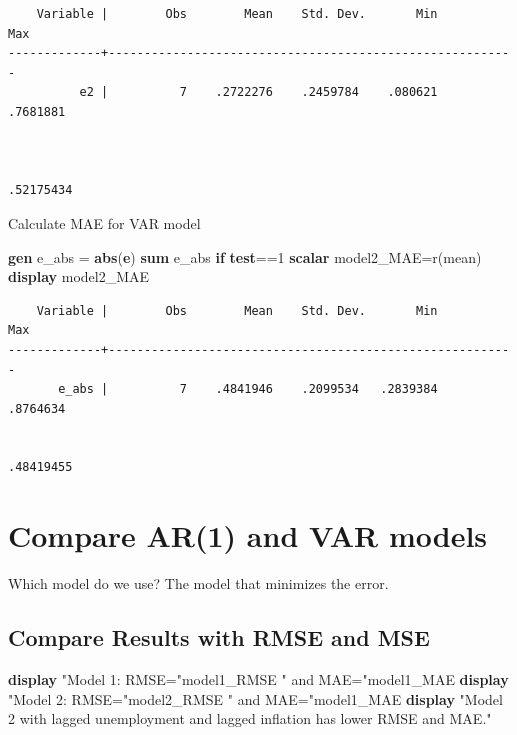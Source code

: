 \documentclass[
]{book}
\newenvironment{Shaded}{\begin{snugshade}}{\end{snugshade}}
\newcommand{\FunctionTok}[1]{\textcolor[rgb]{0.13,0.29,0.53}{\textbf{#1}}}
\newcommand{\KeywordTok}[1]{\textcolor[rgb]{0.13,0.29,0.53}{\textbf{#1}}}
\newcommand{\NormalTok}[1]{#1}
\newcommand{\OtherTok}[1]{\textcolor[rgb]{0.56,0.35,0.01}{#1}}
\newcommand{\StringTok}[1]{\textcolor[rgb]{0.31,0.60,0.02}{#1}}
\begin{document}
\begin{verbatim}
    Variable |        Obs        Mean    Std. Dev.       Min        Max
-------------+---------------------------------------------------------
          e2 |          7    .2722276    .2459784    .080621   .7681881



.52175434
\end{verbatim}

Calculate MAE for VAR model

\begin{Shaded}
\begin{Highlighting}[]
\KeywordTok{gen}\NormalTok{ e\_abs = }\FunctionTok{abs}\NormalTok{(}\FunctionTok{e}\NormalTok{)}
\KeywordTok{sum}\NormalTok{ e\_abs }\KeywordTok{if} \KeywordTok{test}\NormalTok{==1}
\FunctionTok{scalar}\NormalTok{ model2\_MAE=}\OtherTok{\textasciigrave{}r(mean)\textquotesingle{}}
\KeywordTok{display}\NormalTok{ model2\_MAE}
\end{Highlighting}
\end{Shaded}

\begin{verbatim}
    Variable |        Obs        Mean    Std. Dev.       Min        Max
-------------+---------------------------------------------------------
       e_abs |          7    .4841946    .2099534   .2839384   .8764634


.48419455
\end{verbatim}

\section{Compare AR(1) and VAR models}\label{compare-ar1-and-var-models}

Which model do we use? The model that minimizes the error.

\subsection*{Compare Results with RMSE and MSE}\label{compare-results-with-rmse-and-mse}

\begin{Shaded}
\begin{Highlighting}[]
\KeywordTok{display} \StringTok{"Model 1: RMSE="}\NormalTok{model1\_RMSE }\StringTok{" and MAE="}\NormalTok{model1\_MAE}
\KeywordTok{display} \StringTok{"Model 2: RMSE="}\NormalTok{model2\_RMSE }\StringTok{" and MAE="}\NormalTok{model1\_MAE}
\KeywordTok{display} \StringTok{"Model 2 with lagged unemployment and lagged inflation has lower RMSE and MAE."}
\end{Highlighting}
\end{Shaded}
\end{document}
